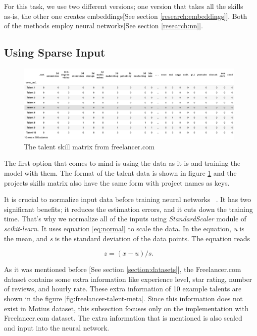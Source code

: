 For this task, we use two different versions; one version that takes all the skills as-is, the other one creates embeddings[See section \ref{research:embeddings}]. Both of the methods employ neural networks[See section \ref{research:nn}].


\subsection{Using Sparse Input}

\begin{figure}[htp]
	\centering
	\includegraphics[width=\textwidth]{figures/FreelancerTalentSkillsMatrix.png}
	\caption{The talent skill matrix from freelancer.com}
	\label{fig:freelancer-talent-matrix}
\end{figure}

The first option that comes to mind is using the data as it is and training the model with them. The format of the talent data is shown in figure \ref{fig:freelancer-talent-matrix} and the projects skills matrix also have the same form with project names as keys.


It is crucial to normalize input data before training neural networks ~\parencite{sola1997importance}. It has two significant benefits; it reduces the estimation errors, and it cuts down the training time. That's why we normalize all of the inputs using \textit{StandardScaler} module of \textit{scikit-learn}. It uses equation  \eqref{eq:normal} to scale the data. In the equation, \textit{u} is the mean, and \textit{s} is the standard deviation of the data points. The equation reads

\begin{equation}
z = (x - u) / s .
\label{eq:normal}
\end{equation}


As it was mentioned before [See section \ref{section:datasets}], the Freelancer.com dataset contains some extra information like experience level, star rating, number of reviews, and hourly rate. These extra information of 10 example talents are shown in the figure \ref{fig:freelancer-talent-meta}. Since this information does not exist in Motius dataset, this subsection focuses only on the implementation with Freelancer.com dataset. The extra information that is mentioned is also scaled and input into the neural network. 


